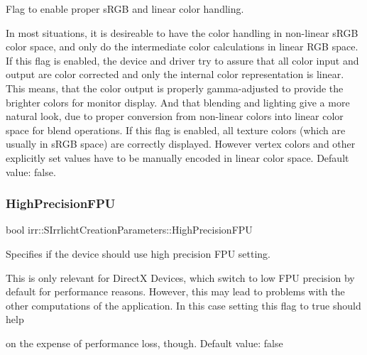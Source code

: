 Flag to enable proper s\+R\+GB and linear color handling. 

In most situations, it is desireable to have the color handling in non-\/linear s\+R\+GB color space, and only do the intermediate color calculations in linear R\+GB space. If this flag is enabled, the device and driver try to assure that all color input and output are color corrected and only the internal color representation is linear. This means, that the color output is properly gamma-\/adjusted to provide the brighter colors for monitor display. And that blending and lighting give a more natural look, due to proper conversion from non-\/linear colors into linear color space for blend operations. If this flag is enabled, all texture colors (which are usually in s\+R\+GB space) are correctly displayed. However vertex colors and other explicitly set values have to be manually encoded in linear color space. Default value\+: false. \mbox{\label{structirr_1_1SIrrlichtCreationParameters_ac790f1359a357f705bc2a5b24a6cc55d}} 
\subsubsection{\texorpdfstring{High\+Precision\+F\+PU}{HighPrecisionFPU}}
{\footnotesize\ttfamily bool irr\+::\+S\+Irrlicht\+Creation\+Parameters\+::\+High\+Precision\+F\+PU}



Specifies if the device should use high precision F\+PU setting. 

This is only relevant for DirectX Devices, which switch to low F\+PU precision by default for performance reasons. However, this may lead to problems with the other computations of the application. In this case setting this flag to true should help
\begin{DoxyItemize}
\item on the expense of performance loss, though. Default value\+: false 
\end{DoxyItemize}\mbox{\label{structirr_1_1SIrrlichtCreationParameters_acf9aee48aa9193f025f5f855d5a147cb}} 
